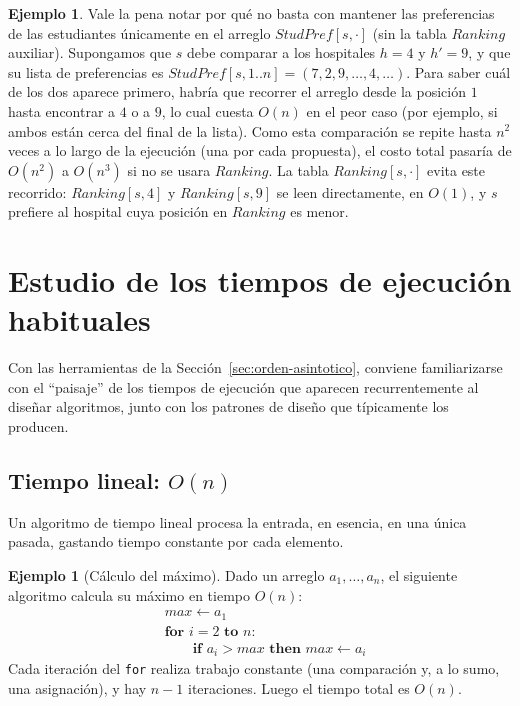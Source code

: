 \documentclass[12pt, spanish, oneside, openany]{book}
\theoremstyle{uprightplain}
\theoremstyle{definition}
\newtheorem{ejemplo}[teorema]{Ejemplo}
\theoremstyle{remark}
\theoremstyle{definition}
\begin{document}
\begin{ejemplo}
\label{ej:por-que-no-array-directo}
Vale la pena notar por qué no basta con mantener las preferencias de las estudiantes únicamente en el arreglo $\mathit{StudPref}[s,\cdot]$ (sin la tabla $\mathit{Ranking}$ auxiliar). Supongamos que $s$ debe comparar a los hospitales $h=4$ y $h'=9$, y que su lista de preferencias es $\mathit{StudPref}[s,1..n]=(7,2,9,\dots,4,\dots)$. Para saber cuál de los dos aparece primero, habría que recorrer el arreglo desde la posición $1$ hasta encontrar a $4$ o a $9$, lo cual cuesta $O(n)$ en el peor caso (por ejemplo, si ambos están cerca del final de la lista). Como esta comparación se repite hasta $n^2$ veces a lo largo de la ejecución (una por cada propuesta), el costo total pasaría de $O(n^2)$ a $O(n^3)$ si no se usara $\mathit{Ranking}$. La tabla $\mathit{Ranking}[s,\cdot]$ evita este recorrido: $\mathit{Ranking}[s,4]$ y $\mathit{Ranking}[s,9]$ se leen directamente, en $O(1)$, y $s$ prefiere al hospital cuya posición en $\mathit{Ranking}$ es menor.
\end{ejemplo}

\section{Estudio de los tiempos de ejecución habituales}
\label{sec:tiempos-habituales}

Con las herramientas de la Sección~\ref{sec:orden-asintotico}, conviene familiarizarse con el ``paisaje'' de los tiempos de ejecución que aparecen recurrentemente al diseñar algoritmos, junto con los patrones de diseño que típicamente los producen.

\subsection{Tiempo lineal: $O(n)$}

Un algoritmo de tiempo lineal procesa la entrada, en esencia, en una única pasada, gastando tiempo constante por cada elemento.

\begin{ejemplo}[Cálculo del máximo]
\label{ej:maximo-lineal}
Dado un arreglo $a_1,\dots,a_n$, el siguiente algoritmo calcula su máximo en tiempo $O(n)$:
\[
\begin{aligned}
&\mathit{max} \leftarrow a_1\\
&\textbf{for } i=2 \textbf{ to } n:\\
&\qquad \textbf{if } a_i > \mathit{max} \textbf{ then } \mathit{max}\leftarrow a_i
\end{aligned}
\]
Cada iteración del \texttt{for} realiza trabajo constante (una comparación y, a lo sumo, una asignación), y hay $n-1$ iteraciones. Luego el tiempo total es $O(n)$.
\end{ejemplo}
\end{document}
